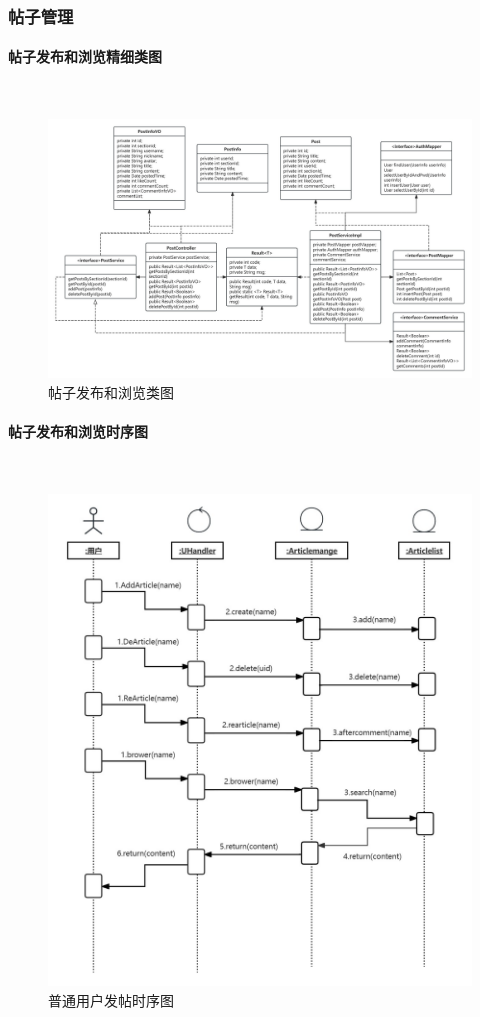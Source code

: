 \documentclass[UTF8]{ctexart}
\newcommand{\subsubsubsection}[1]{\paragraph{#1}\mbox{}\\} %
\begin{document}
\subsubsection{帖子管理}

\subsubsubsection{帖子发布和浏览精细类图}

\begin{figure}[H]
  \centering
  \includegraphics[scale=0.2]{精化类模型图/Post.jpg}
  \caption{帖子发布和浏览类图}
\end{figure}

\subsubsubsection{帖子发布和浏览时序图}

\begin{figure}[H]
  \centering
  \includegraphics[scale=0.3]{顺序图/普通用户发帖.png}
  \caption{普通用户发帖时序图}
\end{figure}
\end{document}
